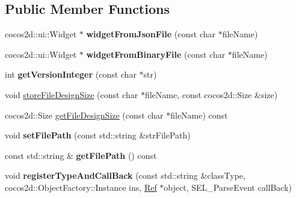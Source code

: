 \subsection*{Public Member Functions}
\begin{DoxyCompactItemize}
\item 
\mbox{\label{classcocostudio_1_1GUIReader_aa85a1dc31547831d1a43ff60d6173915}} 
cocos2d\+::ui\+::\+Widget $\ast$ {\bfseries widget\+From\+Json\+File} (const char $\ast$file\+Name)
\item 
\mbox{\label{classcocostudio_1_1GUIReader_a07bba521a59fafd694a9d908c084ac45}} 
cocos2d\+::ui\+::\+Widget $\ast$ {\bfseries widget\+From\+Binary\+File} (const char $\ast$file\+Name)
\item 
\mbox{\label{classcocostudio_1_1GUIReader_aac24ec52b134ad8005c3f8c3a5b0cd70}} 
int {\bfseries get\+Version\+Integer} (const char $\ast$str)
\item 
void \hyperlink{classcocostudio_1_1GUIReader_a2b5246b10e2a1af0171aa1caf108334b}{store\+File\+Design\+Size} (const char $\ast$file\+Name, const cocos2d\+::\+Size \&size)
\item 
cocos2d\+::\+Size \hyperlink{classcocostudio_1_1GUIReader_a5d16c996e4c47484d4a3df4794b2899f}{get\+File\+Design\+Size} (const char $\ast$file\+Name) const
\item 
\mbox{\label{classcocostudio_1_1GUIReader_a4a0bc0e013587c1d6705ae97c33ae669}} 
void {\bfseries set\+File\+Path} (const std\+::string \&str\+File\+Path)
\item 
\mbox{\label{classcocostudio_1_1GUIReader_a768c2cfa64750d5984cfb80811dcffad}} 
const std\+::string \& {\bfseries get\+File\+Path} () const
\item 
\mbox{\label{classcocostudio_1_1GUIReader_ad0534296eedfb4a2d3e3adba48fb9850}} 
void {\bfseries register\+Type\+And\+Call\+Back} (const std\+::string \&class\+Type, cocos2d\+::\+Object\+Factory\+::\+Instance ins, \hyperlink{classRef}{Ref} $\ast$object, S\+E\+L\+\_\+\+Parse\+Event call\+Back)
\item 
\mbox{\label{classcocostudio_1_1GUIReader_a0a9154b9d7f3234c9be8f1dd9dcb16fd}} 

\end{DoxyCompactItemize}
